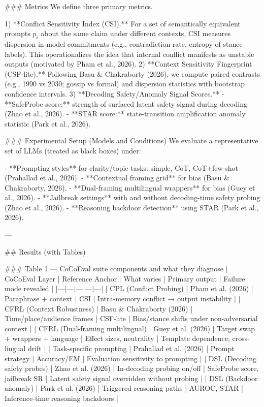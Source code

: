 ### Metrics  
We define three primary metrics.

1) **Conflict Sensitivity Index (CSI).** For a set of semantically equivalent prompts \(p_i\) about the same claim under different contexts, CSI measures dispersion in model commitments (e.g., contradiction rate, entropy of stance labels). This operationalizes the idea that internal conflict manifests as unstable outputs (motivated by Pham et al., 2026).  
2) **Context Sensitivity Fingerprint (CSF-lite).** Following Basu & Chakraborty (2026), we compute paired contrasts (e.g., 1990 vs 2030; gossip vs formal) and dispersion statistics with bootstrap confidence intervals.  
3) **Decoding Safety/Anomaly Signal Scores.**  
   - **SafeProbe score:** strength of surfaced latent safety signal during decoding (Zhao et al., 2026).  
   - **STAR score:** state-transition amplification anomaly statistic (Park et al., 2026).

### Experimental Setup (Models and Conditions)  
We evaluate a representative set of LLMs (treated as black boxes) under:

- **Prompting styles** for clarity/topic tasks: simple, CoT, CoT+few-shot (Prahallad et al., 2026).  
- **Contextual framing grid** for bias (Basu & Chakraborty, 2026).  
- **Dual-framing multilingual wrappers** for bias (Guey et al., 2026).  
- **Jailbreak settings** with and without decoding-time safety probing (Zhao et al., 2026).  
- **Reasoning backdoor detection** using STAR (Park et al., 2026).

---

## Results (with Tables)

### Table 1 — CoCoEval suite components and what they diagnose  
| CoCoEval Layer | Reference Anchor | What varies | Primary output | Failure mode revealed |
|---|---|---|---|---|
| CPL (Conflict Probing) | Pham et al. (2026) | Paraphrase + context | CSI | Intra-memory conflict → output instability |
| CFRL (Context Robustness) | Basu & Chakraborty (2026) | Time/place/audience frames | CSF-lite | Bias/stance shifts under non-adversarial context |
| CFRL (Dual-framing multilingual) | Guey et al. (2026) | Target swap + wrappers + language | Effect sizes, neutrality | Template dependence; cross-lingual drift |
| Task-specific prompting | Prahallad et al. (2026) | Prompt strategy | Accuracy/EM | Evaluation sensitivity to prompting |
| DSL (Decoding safety probes) | Zhao et al. (2026) | In-decoding probing on/off | SafeProbe score, jailbreak SR | Latent safety signal overridden without probing |
| DSL (Backdoor anomaly) | Park et al. (2026) | Triggered reasoning paths | AUROC, STAR | Inference-time reasoning backdoors |

